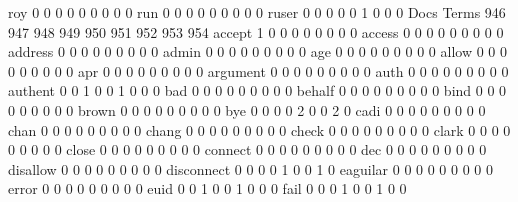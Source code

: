 \documentclass[compress,8pt]{beamer}
\begin{document}
\begin{frame}
\begin{Schunk}
  roy                                        0   0   0   0   0   0   0   0   0
  run                                        0   0   0   0   0   0   0   0   0
  ruser                                      0   0   0   0   0   1   0   0   0
                                          Docs
Terms                                      946 947 948 949 950 951 952 953 954
  accept                                     1   0   0   0   0   0   0   0   0
  access                                     0   0   0   0   0   0   0   0   0
  address                                    0   0   0   0   0   0   0   0   0
  admin                                      0   0   0   0   0   0   0   0   0
  age                                        0   0   0   0   0   0   0   0   0
  allow                                      0   0   0   0   0   0   0   0   0
  apr                                        0   0   0   0   0   0   0   0   0
  argument                                   0   0   0   0   0   0   0   0   0
  auth                                       0   0   0   0   0   0   0   0   0
  authent                                    0   0   1   0   0   1   0   0   0
  bad                                        0   0   0   0   0   0   0   0   0
  behalf                                     0   0   0   0   0   0   0   0   0
  bind                                       0   0   0   0   0   0   0   0   0
  brown                                      0   0   0   0   0   0   0   0   0
  bye                                        0   0   0   0   2   0   0   2   0
  cadi                                       0   0   0   0   0   0   0   0   0
  chan                                       0   0   0   0   0   0   0   0   0
  chang                                      0   0   0   0   0   0   0   0   0
  check                                      0   0   0   0   0   0   0   0   0
  clark                                      0   0   0   0   0   0   0   0   0
  close                                      0   0   0   0   0   0   0   0   0
  connect                                    0   0   0   0   0   0   0   0   0
  dec                                        0   0   0   0   0   0   0   0   0
  disallow                                   0   0   0   0   0   0   0   0   0
  disconnect                                 0   0   0   0   1   0   0   1   0
  eaguilar                                   0   0   0   0   0   0   0   0   0
  error                                      0   0   0   0   0   0   0   0   0
  euid                                       0   0   1   0   0   1   0   0   0
  fail                                       0   0   0   1   0   0   1   0   0

\end{Schunk}
\end{frame}
\end{document}
